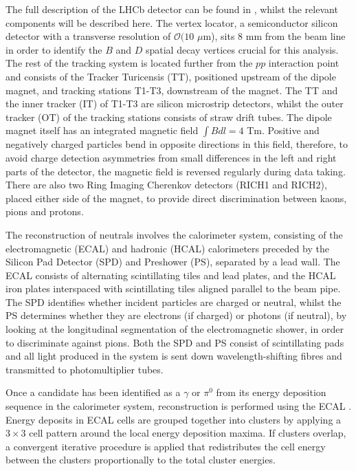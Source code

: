 \documentclass[oneside,12pt]{article}
\begin{document}
The full description of the LHCb detector can be found in \cite{LHCbDetector},
whilst the relevant components will be described here.  The vertex locator, a
semiconductor silicon detector with a transverse resolution of $\mathcal{O}(10$
$\mu$m), sits $8$ mm from the beam line in order to identify the $B$ and $D$
spatial decay vertices crucial for this analysis. The rest of the tracking
system is located further from the $pp$ interaction point and consists of the
Tracker Turicensis (TT), positioned upstream of the dipole magnet, and tracking
stations T1-T3, downstream of the magnet. The TT and the inner tracker (IT) of
T1-T3 are silicon microstrip detectors, whilst the outer tracker (OT) of the
tracking stations consists of straw drift tubes. The dipole magnet itself has an
integrated magnetic field $\int B dl = 4$ Tm.  Positive and negatively charged
particles bend in opposite directions in this field, therefore, to avoid charge
detection asymmetries from small differences in the left and right parts of the
detector, the magnetic field is reversed regularly during data taking.  There
are also two Ring Imaging Cherenkov detectors (RICH1 and RICH2), placed either
side of the magnet, to provide direct discrimination between kaons, pions and
protons.

The reconstruction of neutrals involves the calorimeter system, consisting of
the electromagnetic (ECAL) and hadronic (HCAL) calorimeters preceded by the
Silicon Pad Detector (SPD) and Preshower (PS), separated by a lead wall. The
ECAL consists of alternating scintillating tiles and lead plates, and the HCAL
iron plates interspaced with scintillating tiles aligned parallel to the beam
pipe. The SPD identifies whether incident particles are charged or neutral,
whilst the PS determines whether they are electrons (if charged) or photons (if
neutral), by looking at the longitudinal segmentation of the electromagnetic
shower, in order to discriminate against pions. Both the SPD and PS consist of
scintillating pads and all light produced in the system is sent down
wavelength-shifting fibres and transmitted to photomultiplier tubes.

Once a candidate has been identified as a $\gamma$ or $\pi^0$ from its energy
deposition sequence in the calorimeter system, reconstruction is performed using
the ECAL \cite{NeutralReconstruction}. Energy deposits in ECAL cells are grouped
together into clusters by applying a $3\times3$ cell pattern around the local
energy deposition maxima. If clusters overlap, a convergent iterative procedure
is applied that redistributes the cell energy between the clusters
proportionally to the total cluster energies.
\end{document}
